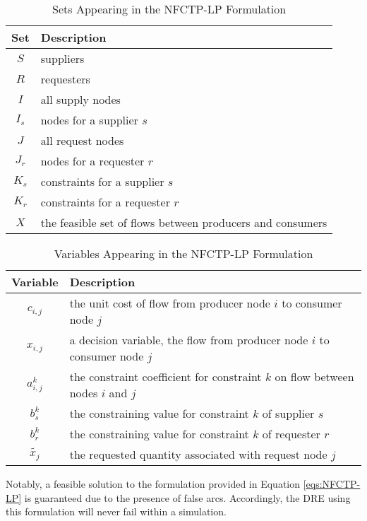 \begin{table} [h!]
\centering
\begin{tabularx}{\columnwidth-10pt}{|c|X|} %
\hline
Set         & Description \\
\hline
$S$     & suppliers \\
$R$     & requesters \\
$I$     & all supply nodes \\
$I_s$   & nodes for a supplier $s$ \\
$J$     & all request nodes \\
$J_r$   & nodes for a requester $r$ \\
$K_s$   & constraints for a supplier $s$ \\
$K_r$   & constraints for a requester $r$ \\
$X$         & the feasible set of flows between producers and consumers  \\
\hline
\end{tabularx}
\caption{Sets Appearing in the NFCTP-LP Formulation}
\label{tbl:NFCTP-LP-sets}
\end{table}

\begin{table} [h!]
\centering
\begin{tabularx}{\columnwidth-10pt}{|c|X|} %
\hline
Variable    & Description \\
\hline
$c_{i,j}$             & the unit cost of flow
                          from producer node $i$ to consumer node $j$  \\
$x_{i,j}$             & a decision variable, the flow 
                          from producer node $i$ to consumer node $j$  \\
$a_{i,j}^k$ & the constraint coefficient for constraint $k$ 
                          on flow between nodes $i$ and $j$  \\
$b_s^k$   & the constraining value for constraint $k$ of supplier $s$ \\
$b_r^k$   & the constraining value for constraint $k$ of requester $r$ \\
$\tilde{x_j}$ & the requested quantity associated with request node $j$ \\
\hline
\end{tabularx}
\caption{Variables Appearing in the NFCTP-LP Formulation}
\label{tbl:NFCTP-LP-vars}
\end{table}

Notably, a feasible solution to the formulation provided in Equation
\ref{eqs:NFCTP-LP} is guaranteed due to the presence of false arcs. Accordingly,
the DRE using this formulation will never fail within a simulation.

